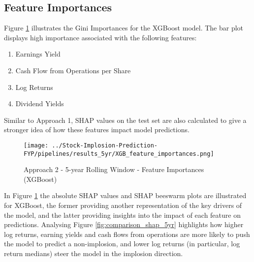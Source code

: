 \documentclass[a4paper]{report}
\begin{document}


\subsection{Feature Importances}
Figure \ref{fig:xgb_5yr_feats} illustrates the Gini Importances for the XGBoost model. The bar plot displays high importance associated 
with the following features:
\begin{enumerate}
  \item Earnings Yield
  \item Cash Flow from Operations per Share
  \item Log Returns
  \item Dividend Yields
\end{enumerate}
Similar to Approach 1, SHAP values on the test set are also calculated to give a stronger idea of how these features impact model predictions.
\begin{figure}[h] 
  \centering
  \texttt{[image: ../Stock-Implosion-Prediction-FYP/pipelines/results\_5yr/XGB\_feature\_importances.png]} %
  \caption{Approach 2 - 5-year Rolling Window - Feature Importances (XGBoost)}
  \label{fig:xgb_5yr_feats}
\end{figure}In Figure \ref{fig:xgb_5yr_feats} the absolute SHAP values and SHAP beeswarm plots are illustrated for XGBoost, the former providing another representation of the key drivers of the model, 
and the latter providing insights into the impact of each feature on predictions. Analysing Figure \ref{fig:comparison_shap_5yr} highlights how higher log returns, earning yields and cash flows from operations
are more likely to push the model to predict a non-implosion, and lower log returns (in particular, log return medians) steer the model in the implosion direction.
\end{document}
